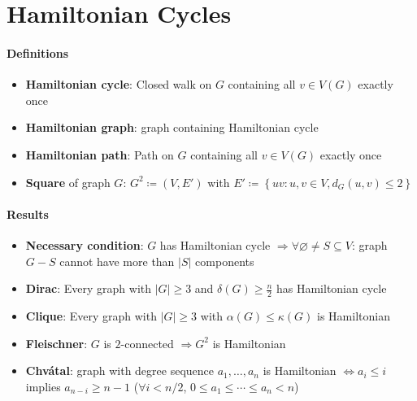 \section{Hamiltonian Cycles}

\paragraph{Definitions}
\begin{itemize}
  \item \textbf{Hamiltonian cycle}: Closed walk on \( G \) containing all \( v \in V(G) \) exactly once
  \item \textbf{Hamiltonian graph}: graph containing Hamiltonian cycle
  \item \textbf{Hamiltonian path}: Path on \( G \) containing all \( v \in V(G) \) exactly once
  \item \textbf{Square} of graph \( G \): \( G^2 \coloneqq (V,E') \) with \( E' \coloneqq \left \{ uv: u,v \in V, d_G(u,v) \leq 2 \right \} \)
\end{itemize}

\paragraph{Results}
\begin{itemize}
  \item \textbf{Necessary condition}: \( G \) has Hamiltonian cycle \( \Rightarrow \forall \varnothing \neq S \subseteq V \): graph \( G - S \) cannot have more than \( \left\vert S \right\vert \) components
  \item \textbf{Dirac}: Every graph with \( \left\vert G \right\vert \geq 3 \) and \( \delta(G) \geq \tfrac{n}{2} \) has Hamiltonian cycle
  \item \textbf{Clique}: Every graph with \( \left\vert G \right\vert \geq 3 \) with \( \alpha(G) \leq \kappa(G) \) is Hamiltonian
  \item \textbf{Fleischner}: \( G \) is \( 2 \)-connected \( \Rightarrow G^2 \) is Hamiltonian
  \item \textbf{Chvátal}: graph with degree sequence \( a_1,\dots,a_n \) is Hamiltonian \( \Leftrightarrow a_i \leq i \) implies \( a_{n-i} \geq n -1 \) (\( \forall i < n/2 \), \( 0 \leq a_1 \leq \cdots \leq a_n < n \))
\end{itemize}